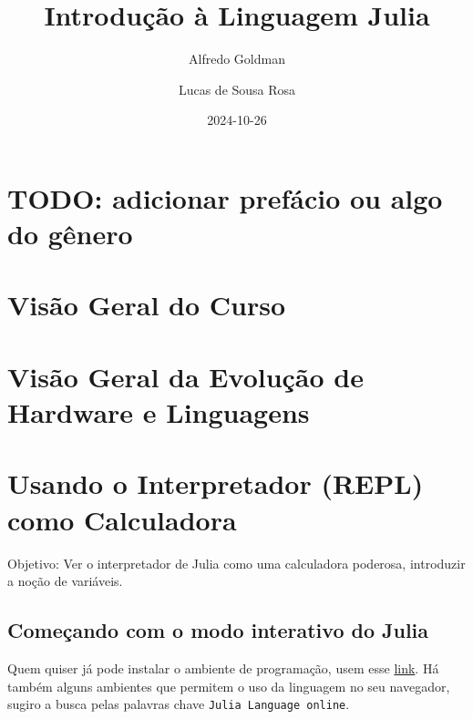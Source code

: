 \documentclass[
  letterpaper,
  DIV=11,
  numbers=noendperiod]{scrreprt}
\title{Introdução à Linguagem Julia}
\author{Alfredo Goldman \and Lucas de Sousa Rosa}
\date{2024-10-26}
\renewcommand*\contentsname{Índice}
\newcommand\contentsname{Índice}
\begin{document}
\maketitle

\renewcommand*\contentsname{Índice}
{
\hypersetup{linkcolor=}
\setcounter{tocdepth}{2}
\tableofcontents
}


\chapter*{TODO: adicionar prefácio ou algo do
gênero}\label{todo-adicionar-prefuxe1cio-ou-algo-do-guxeanero}



\chapter{Visão Geral do Curso}\label{visuxe3o-geral-do-curso}


\chapter{Visão Geral da Evolução de Hardware e
Linguagens}\label{visuxe3o-geral-da-evoluuxe7uxe3o-de-hardware-e-linguagens}


\chapter{Usando o Interpretador (REPL) como
Calculadora}\label{usando-o-interpretador-repl-como-calculadora}

Objetivo: Ver o interpretador de Julia como uma calculadora poderosa,
introduzir a noção de variáveis.

\section{Começando com o modo interativo do
Julia}\label{comeuxe7ando-com-o-modo-interativo-do-julia}

Quem quiser já pode instalar o ambiente de programação, usem esse
\href{https://julialang.org/}{link}. Há também alguns ambientes que
permitem o uso da linguagem no seu navegador, sugiro a busca pelas
palavras chave \texttt{Julia\ Language\ online}.
\end{document}
